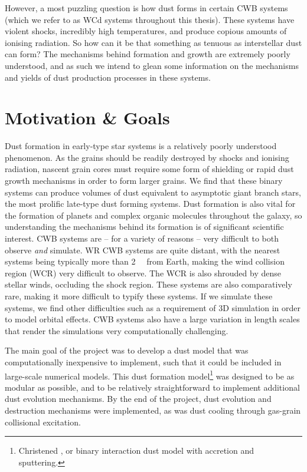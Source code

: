 However, a most puzzling question is how dust forms in certain CWB systems (which we refer to as WCd systems throughout this thesis).
These systems have violent shocks, incredibly high temperatures, and produce copious amounts of ionising radiation.
So how can it be that something as tenuous as interstellar dust can form?
The mechanisms behind formation and growth are extremely poorly understood, and as such we intend to glean some information on the mechanisms and yields of dust production processes in these systems.

\section{Motivation \& Goals}
\label{sec:projectgoals}

Dust formation in early-type star systems is a relatively poorly understood phenomenon.
As the grains should be readily destroyed by shocks and ionising radiation, nascent grain cores must require some form of shielding or rapid dust growth mechanisms in order to form larger grains.
We find that these binary systems can produce volumes of dust equivalent to asymptotic giant branch stars, the most prolific late-type dust forming systems.
Dust formation is also vital for the formation of planets and complex organic molecules throughout the galaxy, so understanding the mechanisms behind its formation is of significant scientific interest.
CWB systems are -- for a variety of reasons -- very difficult to both observe \emph{and} simulate.
WR CWB systems are quite distant, with the nearest systems being typically more than \SI{2}{\kilo\parsec} from Earth, making the wind collision region (WCR) very difficult to observe.
The WCR is also shrouded by dense stellar winds, occluding the shock region.
These systems are also comparatively rare, making it more difficult to typify these systems.
If we simulate these systems, we find other difficulties such as a requirement of 3D simulation in order to model orbital effects.
CWB systems also have a large variation in length scales that render the simulations very computationally challenging.

The main goal of the project was to develop a dust model that was computationally inexpensive to implement, such that it could be included in large-scale numerical models.
This dust formation model\footnote{Christened \bidmas{}, or binary interaction dust model with accretion and sputtering.} was designed to be as modular as possible, and to be relatively straightforward to implement additional dust evolution mechanisms.
By the end of the project, dust evolution and destruction mechanisms were implemented, as was dust cooling through gas-grain collisional excitation.

